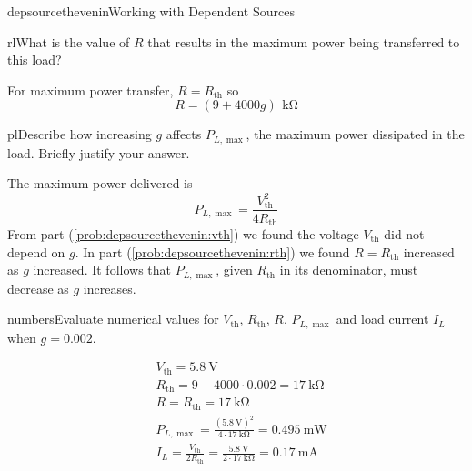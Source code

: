 \begin{mainquestion}{depsourcethevenin}{Working with Dependent Sources}
\begin{partquestion}{rl}{What is the value of $R$ that results in the maximum power being transferred to this load?}
\begin{answer}
For maximum power transfer, $R=R_{\mathrm{th}}$ so
\[
R=(9+4000g)\,\qty{}{\kilo\ohm}
\]
\end{answer}
\end{partquestion}

\begin{partquestion}{pl}{Describe how increasing $g$ affects $P_{L,\max}$, the maximum power dissipated in the load.  Briefly justify your answer.}
\begin{answer}
The maximum power delivered is
\[
P_{L,\max}= \frac{V_{\mathrm{th}}^2}{4R_{\mathrm{th}}}
\]
From part (\cref{prob:depsourcethevenin:vth}) we found the voltage $V_{\mathrm{th}}$ did not depend on $g$. In part (\cref{prob:depsourcethevenin:rth}) we found $R=R_{\mathrm{th}}$ increased as $g$ increased.  It follows that $P_{L,\max}$, given $R_{\mathrm{th}}$ in its denominator, must decrease as $g$ increases.
\end{answer}
\end{partquestion}

\begin{partquestion}{numbers}{Evaluate numerical values for $V_\mathrm{th}$, $R_\mathrm{th}$, $R$, $P_{L,\max}$ and load current $I_L$ when $g=0.002$.}
\begin{answer}
\begin{align*}
&V_{\mathrm{th}}=\qty{5.8}{\volt}\\
&R_{\mathrm{th}}=9+4000\cdot0.002=\qty{17}{\kilo\ohm}\\
&R=R_{\mathrm{th}}=\qty{17}{\kilo\ohm}\\
&P_{L,\max}= \frac{(\qty{5.8}{\volt})^2}{4\cdot\qty{17}{\kilo\ohm}}=\qty{0.495}{\milli\watt}\\
&I_L=\frac{V_{\mathrm{th}}}{2R_{\mathrm{th}}}=\frac{\qty{5.8}{\volt}}{2\cdot\qty{17}{\kilo\ohm}}=\qty{0.17}{\milli\ampere}
\end{align*}
\end{answer}
\end{partquestion}


\end{mainquestion}
